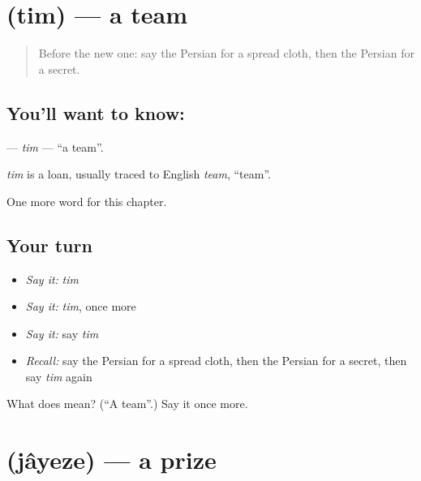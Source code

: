 \section[\texorpdfstring{\fa{تیم} (tim)}{تیم (tim)}]{ (tim) — a team}

\label{lesson:FA-C278-tim}



\begin{quote}
Before the new one: say the Persian for a spread cloth, then the Persian for a secret.
\end{quote}

\subsection*{You'll want to know: }
\textbf{} — \emph{tim} — \textquotedblleft{}a team\textquotedblright{}.

\begin{cousinweb}
\emph{tim} is a loan, usually traced to English \emph{team}, \textquotedblleft{}team\textquotedblright{}.
\end{cousinweb}

\begin{grammarlens}[title={What you've built}]
One more word for this chapter.
\end{grammarlens}

\subsection*{Your turn}
\begin{itemize}
\raggedright
  \item \emph{Say it:} \emph{tim}
  \item \emph{Say it:} \emph{tim}, once more
  \item \emph{Say it:} say \emph{tim}
  \item \emph{Recall:} say the Persian for a spread cloth, then the Persian for a secret, then say \emph{tim} again
\end{itemize}

\begin{tcolorbox}[breakable,colback=teal!4,colframe=teal!35!black,title={Before you move on}]
What does  mean? (\textquotedblleft{}A team\textquotedblright{}.) Say it once more.
\end{tcolorbox}
\section[\texorpdfstring{\fa{جایزه} (jâyeze)}{جایزه (jâyeze)}]{ (jâyeze) — a prize}

